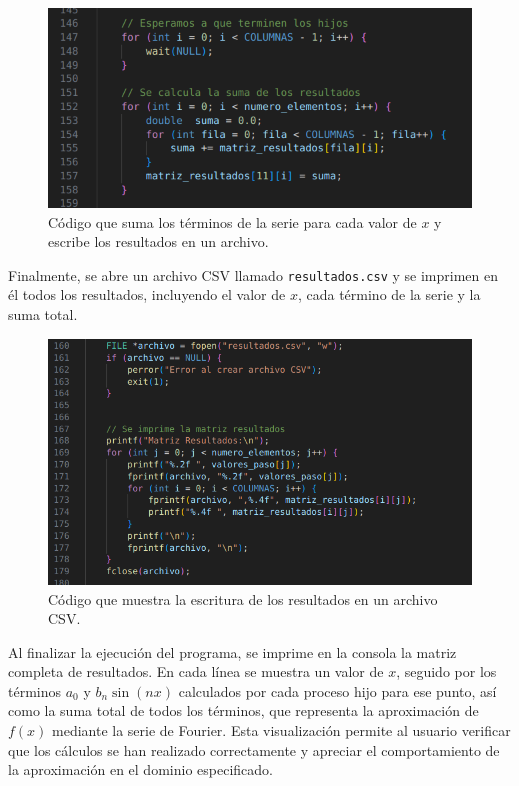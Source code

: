 {\begin{figure}[H]
    \centering
    \includegraphics[width=0.9\linewidth]{Figures/codigo/suma_resultados.png}
    \caption[Suma de los resultados y generación de archivo]{Código que suma los términos de la serie para cada valor de \( x \) y escribe los resultados en un archivo.}
    \label{fig:suma-resultados}
\end{figure}

Finalmente, se abre un archivo CSV llamado \texttt{resultados.csv} y se imprimen en él todos los resultados, incluyendo el valor de \( x \), cada término de la serie y la suma total.

\begin{figure}[H]
    \centering
    \includegraphics[width=0.9\linewidth]{Figures/codigo/escritura_archivo.png}
    \caption[Escritura de resultados en archivo CSV]{Código que muestra la escritura de los resultados en un archivo CSV.}
    \label{fig:escritura-archivo}
\end{figure}


Al finalizar la ejecución del programa, se imprime en la consola la matriz completa de resultados. En cada línea se muestra un valor de \(x\), seguido por los términos \(a_0\) y \(b_n \sin(nx)\) calculados por cada proceso hijo para ese punto, así como la suma total de todos los términos, que representa la aproximación de \(f(x)\) mediante la serie de Fourier. Esta visualización permite al usuario verificar que los cálculos se han realizado correctamente y apreciar el comportamiento de la aproximación en el dominio especificado.

}
